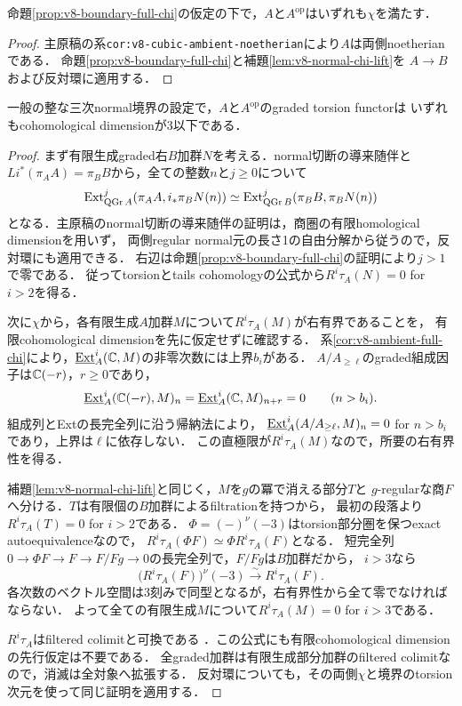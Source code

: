 \documentclass[11pt,a4paper]{ltjsarticle}
\begin{document}
\begin{corollary}
\label{cor:v8-ambient-full-chi}
命題\ref{prop:v8-boundary-full-chi}の仮定の下で，$A$と$A^{\mathrm{op}}$はいずれも$\chi$を満たす．
\end{corollary}
\begin{proof}
主原稿の系\texttt{cor:v8-cubic-ambient-noetherian}により$A$は両側noetherianである．
命題\ref{prop:v8-boundary-full-chi}と補題\ref{lem:v8-normal-chi-lift}を
$A\to B$および反対環に適用する．
\end{proof}

\begin{proposition}
\label{prop:v8-ambient-local-cd}
一般の整な三次normal境界の設定で，$A$と$A^{\mathrm{op}}$のgraded torsion functorは
いずれもcohomological dimensionが$3$以下である．
\end{proposition}
\begin{proof}
まず有限生成graded右$B$加群$N$を考える．normal切断の導来随伴と
$Li^*(\pi_AA)=\pi_BB$から，全ての整数$n$と$j\geq0$について
\[
 \operatorname{Ext}^j_{\operatorname{QGr} A}(\pi_AA,i_*\pi_BN(n))
 \simeq\operatorname{Ext}^j_{\operatorname{QGr} B}(\pi_BB,\pi_BN(n))
\]
となる．主原稿のnormal切断の導来随伴の証明は，商圏の有限homological dimensionを用いず，
両側regular normal元の長さ1の自由分解から従うので，反対環にも適用できる．
右辺は命題\ref{prop:v8-boundary-full-chi}の証明により$j>1$で零である．
従ってtorsionとtails cohomologyの公式から$R^i\tau_A(N)=0$ for $i>2$を得る．

次に$\chi$から，各有限生成$A$加群$M$について$R^i\tau_A(M)$が右有界であることを，
有限cohomological dimensionを先に仮定せずに確認する．
系\ref{cor:v8-ambient-full-chi}により，$\underline{\operatorname{Ext}}_A^i(\mathbb C,M)$の非零次数には上界$b_i$がある．
$A/A_{\geq\ell}$のgraded組成因子は$\mathbb C(-r)$，$r\geq0$であり，
\[
 \underline{\operatorname{Ext}}_A^i(\mathbb C(-r),M)_n
 =\underline{\operatorname{Ext}}_A^i(\mathbb C,M)_{n+r}=0\qquad(n>b_i).
\]
組成列とExtの長完全列に沿う帰納法により，
$\underline{\operatorname{Ext}}_A^i(A/A_{\geq\ell},M)_n=0$ for $n>b_i$であり，上界は$\ell$に依存しない．
この直極限が$R^i\tau_A(M)$なので，所要の右有界性を得る．

補題\ref{lem:v8-normal-chi-lift}と同じく，$M$を$g$の冪で消える部分$T$と
$g$-regularな商$F$へ分ける．$T$は有限個の$B$加群によるfiltrationを持つから，
最初の段落より$R^i\tau_A(T)=0$ for $i>2$である．
$\Phi=(-)^\nu(-3)$はtorsion部分圏を保つexact autoequivalenceなので，
$R^i\tau_A(\Phi F)\simeq\Phi R^i\tau_A(F)$となる．
短完全列$0\to\Phi F\to F\to F/Fg\to0$の長完全列で，$F/Fg$は$B$加群だから，
$i>3$なら
\[
 \bigl(R^i\tau_A(F)\bigr)^\nu(-3)
 \xrightarrow{\sim}R^i\tau_A(F).
\]
各次数のベクトル空間は3刻みで同型となるが，右有界性から全て零でなければならない．
よって全ての有限生成$M$について$R^i\tau_A(M)=0$ for $i>3$である．

$R^i\tau_A$はfiltered colimitと可換である
\cite[\S4.1, Lemma 4.1.2]{BvdBGenerators}．この公式にも有限cohomological dimensionの先行仮定は不要である．
全graded加群は有限生成部分加群のfiltered colimitなので，消滅は全対象へ拡張する．
反対環についても，その両側$\chi$と境界のtorsion次元を使って同じ証明を適用する．
\end{proof}
\end{document}
